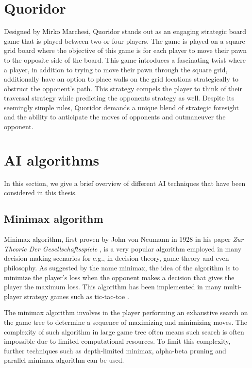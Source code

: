 \section{Quoridor}

Designed by Mirko Marchesi, Quoridor stands out as an engaging strategic board game that is played between two or four players. The game is played on a square grid board where the objective of this game is for each player to move their pawn to the opposite side of the board. This game introduces a fascinating twist where a player, in addition to trying to move their pawn through the square grid, additionally have an option to place walls on the grid locations strategically to obstruct the opponent's path. This strategy compels the player to think of their traversal strategy while predicting the opponents strategy as well. Despite its seemingly simple rules, Quoridor demands a unique blend of strategic foresight and the ability to anticipate the moves of opponents and outmaneuver the opponent.


\section{AI algorithms}
In this section, we give a brief overview of different \gls{AI} techniques that have been considered in this thesis.

\subsection{Minimax algorithm}
Minimax algorithm, first proven by John von Neumann in 1928 in his paper \textit{Zur Theorie Der Gesellschaftsspiele} \citep{v1928theorie}, is a very popular algorithm employed in many decision-making scenarios for e.g., in decision theory, game theory and even philosophy. As suggested by the name minimax, the idea of the algorithm is to minimize the player's loss when the opponent makes a decision that gives the player the maximum loss. This algorithm has been implemented in many multi-player strategy games such as tic-tac-toe \citep{savelli2008tic}. 

The minimax algorithm involves in the player performing an exhaustive search on the game tree to determine a sequence of maximizing and minimizing moves. The complexity of such algorithm in large game tree often means such search is often impossible due to limited computational resources. To limit this complexity, further techniques such as depth-limited minimax, alpha-beta pruning and parallel minimax algorithm can be used.

